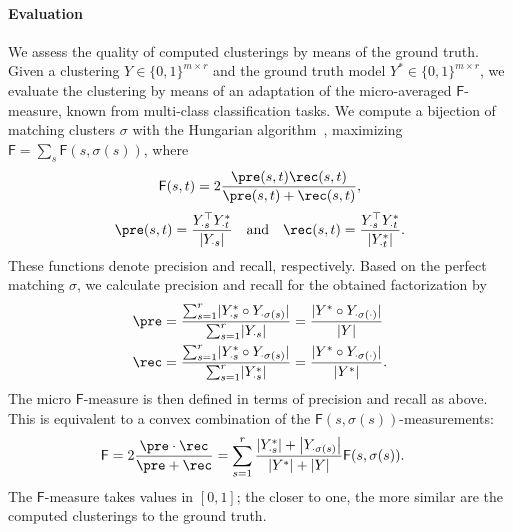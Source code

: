 \paragraph{Evaluation}
We assess the quality of computed clusterings by means of the ground truth. Given a clustering $Y\in\{0,1\}^{m\times r}$ and the ground truth model $Y^*\in\{0,1\}^{m\times r}$, we evaluate the clustering by means of an adaptation of the micro-averaged $\mathsf{F}$-measure, known from multi-class classification tasks. We compute a bijection of matching clusters $\sigma$ with the Hungarian algorithm~\citep{kuhn1955hungarian}, maximizing $\mathsf{F}=\sum_s \mathsf{F}(s,\sigma(s))$, where
\[\mathsf{F}(s,t) = 2\frac{\pre(s,t)\rec(s,t)}{\pre(s,t)+\rec(s,t)},\]
$$
\pre(s,t) = \frac{Y_{\cdot s}^\top Y^*_{\cdot t}}{\lvert Y_{\cdot s}\rvert } \quad\text{and}\quad \rec(s,t) = \frac{Y_{\cdot s}^\top Y^*_{\cdot t}}{\lvert Y^*_{\cdot t}\rvert }.
$$
These functions denote precision and recall, respectively. 
Based on the perfect matching $\sigma$, we calculate precision and recall for the obtained factorization by
\begin{align*}
\pre &= \frac{\sum_{s=1}^r\lvert Y^*_{\cdot s}\circ Y_{\cdot \sigma(s)} \rvert }{\sum_{s=1}^r\lvert Y_{\cdot s} \rvert } 
= \frac{\lvert Y^*\circ Y_{\cdot \sigma(\cdot)}\rvert }{\lvert Y\rvert }\\ 
\rec &= \frac{\sum_{s=1}^r\lvert Y^*_{\cdot s}\circ Y_{\cdot \sigma(s)} \rvert }{\sum_{s=1}^r\lvert Y_{\cdot s}^* \rvert } 
    = \frac{\lvert Y^*\circ Y_{\cdot\sigma(\cdot)}\rvert }{\lvert Y^*\rvert }.
\end{align*}
The micro $\mathsf{F}$-measure is then defined in terms of precision and recall as above. This is equivalent to a convex combination of the $\mathsf{F}(s,\sigma(s))$-measurements:  
\begin{align*}
	\mathsf{F}&=2\frac{\pre\cdot\rec}{\pre+\rec}
    = \sum_{s=1}^r\frac{\left\lvert Y^*_{\cdot s}\right\rvert  + \left\lvert Y_{\cdot\sigma(s)}\right\rvert }{\left\lvert Y^*\right\rvert +\left\lvert Y \right\rvert }\mathsf{F}(s,\sigma(s)).
\end{align*}
The $\mathsf{F}$-measure takes values in $[0,1]$; the closer to one, the more similar are the computed clusterings to the ground truth. 
